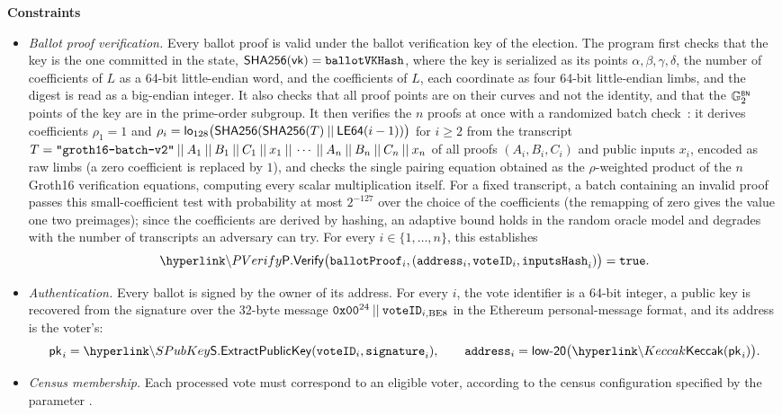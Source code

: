 	\textbf{Constraints} \\ \vspace{-0.4cm}
	\begin{itemize}
		\item \emph{Ballot proof verification.} Every ballot proof is valid under the ballot verification key of the election. The program first checks that the key is the one committed in the state, ${\sf{SHA256}}(\mathsf{vk}) = \texttt{ballotVKHash}$, where the key is serialized as its points $\alpha, \beta, \gamma, \delta$, the number of coefficients of $L$ as a 64-bit little-endian word, and the coefficients of $L$, each coordinate as four 64-bit little-endian limbs, and the digest is read as a big-endian integer. It also checks that all proof points are on their curves and not the identity, and that the ${\mathbb{G}}^{\text{\tiny \sf BN}}_2$ points of the key are in the prime-order subgroup. It then verifies the $n$ proofs at once with a randomized batch check~\cite{bellare1998batch}: it derives coefficients $\rho_1 = 1$ and $\rho_i = \mathsf{lo}_{128}\bigl({\sf{SHA256}}({\sf{SHA256}}(T) \:||\: \mathsf{LE64}(i-1))\bigr)$ for $i \ge 2$ from the transcript $T = \texttt{"groth16-batch-v2"} \:||\: A_1 \:||\: B_1 \:||\: C_1 \:||\: x_1 \:||\: \cdots \:||\: A_n \:||\: B_n \:||\: C_n \:||\: x_n$ of all proofs $(A_i, B_i, C_i)$ and public inputs $x_i$, encoded as raw limbs (a zero coefficient is replaced by $1$), and checks the single pairing equation obtained as the $\rho$-weighted product of the $n$ Groth16 verification equations, computing every scalar multiplication itself. For a fixed transcript, a batch containing an invalid proof passes this small-coefficient test with probability at most $2^{-127}$ over the choice of the coefficients (the remapping of zero gives the value one two preimages); since the coefficients are derived by hashing, an adaptive bound holds in the random oracle model and degrades with the number of transcripts an adversary can try. For every $i \in \{1,\dots,n\}$, this establishes
			$$\hlget{\PVerify}\bigl(\ballotproof_i, (\address_i, \voteid_i, \ballotinputshash_i)\bigr) = \true.$$
		\item \emph{Authentication.} Every ballot is signed by the owner of its address. For every $i$, the vote identifier is a 64-bit integer, a public key is recovered from the signature over the 32-byte message $\texttt{0x00}^{24} \:||\: \texttt{voteID}_{i,\text{BE8}}$ in the Ethereum personal-message format, and its address is the voter's:
			$$\pk_i = \hlget{\SPubKey}(\voteid_i, \signature_i), \qquad \address_i = \mathsf{low\text{-}20}\bigl(\hlget{\Keccak}(\pk_i)\bigr).$$
		\item \emph{Census membership.} Each processed vote must correspond to an eligible voter, according to the census configuration specified by the parameter \censusorigin.

\end{itemize}
